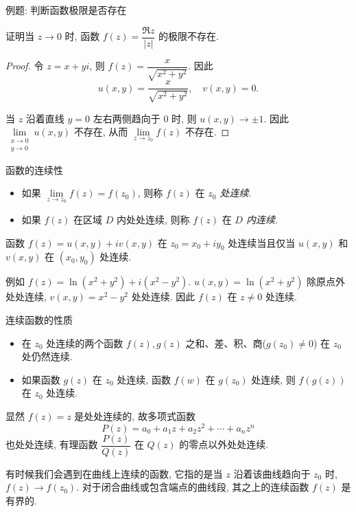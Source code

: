 \begin{frame}{例题: 判断函数极限是否存在}
\begin{example}
证明当 $z\to0$ 时, 函数 $f(z)=\dfrac{\Re z}{|z|}$ 的极限不存在.
\end{example}
\begin{proof}
令 $z=x+yi$, 则 $f(z)=\dfrac x{\sqrt{x^2+y^2}}$.
\onslide<+->
因此
\[u(x,y)=\frac x{\sqrt{x^2+y^2}},\quad v(x,y)=0.\]

\onslide<+->
当 $z$ 沿着直线 $y=0$ 左右两侧趋向于 $0$ 时, 则 $u(x,y)\to\pm1$.
\onslide<+->
因此 $\lim\limits_{\substack{x\to 0\\y\to0}}u(x,y)$ 不存在,
\onslide<+->
从而 $\lim\limits_{z\to z_0}f(z)$ 不存在.
\end{proof}
\end{frame}


\begin{frame}{函数的连续性}
\begin{definition}
\begin{itemize}
\item 如果 $\lim\limits_{z\to z_0}f(z)=f(z_0)$, 则称 $f(z)$ 在 \emph{$z_0$ 处连续}.
\item 如果 $f(z)$ 在区域 $D$ 内处处连续, 则称 $f(z)$ 在 \emph{$D$ 内连续}.
\end{itemize}
\end{definition}

\begin{theorem}
函数 $f(z)=u(x,y)+iv(x,y)$ 在 $z_0=x_0+iy_0$ 处连续当且仅当 $u(x,y)$ 和 $v(x,y)$ 在 $(x_0,y_0)$ 处连续.
\end{theorem}

\onslide<+->
例如 $f(z)=\ln(x^2+y^2)+i(x^2-y^2)$.
\onslide<+->
$u(x,y)=\ln(x^2+y^2)$ 除原点外处处连续, $v(x,y)=x^2-y^2$ 处处连续.
\onslide<+->
因此 $f(z)$ 在 $z\neq0$ 处连续.
\end{frame}


\begin{frame}{连续函数的性质}
\begin{theorem}
\begin{itemize}
\item 在 $z_0$ 处连续的两个函数 $f(z),g(z)$ 之和、差、积、商($g(z_0)\neq 0$) 在 $z_0$ 处仍然连续.
\item 如果函数 $g(z)$ 在 $z_0$ 处连续, 函数 $f(w)$ 在 $g(z_0)$ 处连续, 则 $f(g(z))$ 在 $z_0$ 处连续.
\end{itemize}
\end{theorem}

\onslide<+->
显然 $f(z)=z$ 是处处连续的,
\onslide<+->
故多项式函数
\[P(z)=a_0+a_1z+a_2z^2+\cdots+a_nz^n\]
也处处连续,
\onslide<+->
有理函数 $\dfrac{P(z)}{Q(z)}$ 在 $Q(z)$ 的零点以外处处连续.

\onslide<+->
有时候我们会遇到在曲线上连续的函数, 它指的是当 $z$ 沿着该曲线趋向于 $z_0$ 时, $f(z)\to f(z_0)$.
\onslide<+->
对于闭合曲线或包含端点的曲线段, 其之上的连续函数 $f(z)$ 是有界的.
\end{frame}



